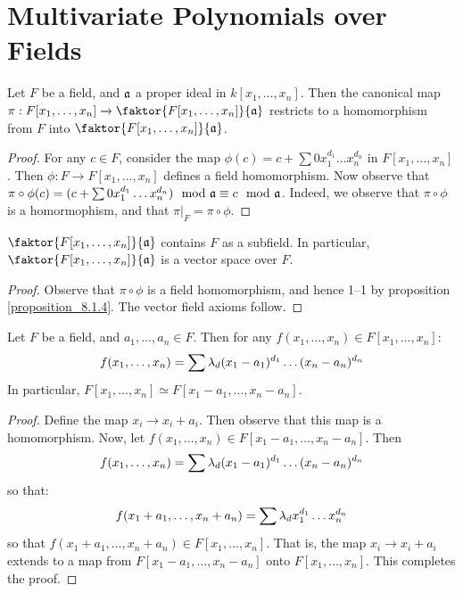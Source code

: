 \section{Multivariate Polynomials over Fields}

\begin{theorem}\label{theorem_8.8.1}
  Let $F$ be a field, and $\mathfrak{a}$ a proper ideal in $k[x_1, \dots,
  x_n]$. Then the canonical map $\pi:F[x_1, \dots, x_n] \xrightarrow{}
  \faktor{F[x_1, \dots, x_n]}{\af}$ restricts to a homomorphism from
  $F$ into $\faktor{F[x_1, \dots, x_n]}{\af}$.
\end{theorem}
\begin{proof}
  For any $c \in F$, consider the map $\phi(c)=c+\sum{0x_1^{d_1} \dots
  x_n^{d_n}}$ in $F[x_1, \dots, x_n]$. Then $\phi:F \xrightarrow{}
  F[x_1, \dots, x_n]$ defines a field homomorphism. Now observe that
  $\pi \circ \phi(c)=(c+\sum{0x_1^{d_1} \dots x_n^{d_n}}) \mod{\mathfrak{a}}
  \equiv c \mod{\mathfrak{a}}$. Indeed, we observe that $\pi \circ \phi$ is a
  homormophism, and that $\pi|_F=\pi \circ \phi$.
\end{proof}
\begin{corollary}
  $\faktor{F[x_1, \dots, x_n]}{\af}$ contains $F$ as a subfield. In
  particular, $\faktor{F[x_1, \dots, x_n]}{\af}$ is a vector space
  over $F$.
\end{corollary}
\begin{proof}
  Observe that $\pi \circ \phi$ is a field homomorphism, and hence
  1--1 by proposition \ref{proposition_8.1.4}. The vector field
  axioms follow.
\end{proof}

\begin{proposition}\label{proposition_8.8.2}
  Let $F$ be a field, and $a_1, \dots, a_n \in F$. Then for any
  $f(x_1, \dots, x_n) \in F[x_1, \dots, x_n]$:
  \begin{equation*}
    f(x_1, \dots, x_n)=\sum{\lambda_d(x_1-a_1)^{d_1} \dots (x_n-a_n)^{d_n}}
  \end{equation*}
  In particular, $F[x_1, \dots, x_n] \simeq F[x_1-a_1, \dots,
  x_n-a_n]$.
\end{proposition}
\begin{proof}
  Define the map $x_i \xrightarrow{} x_{i}+a_i$. Then observe that
  this map is a homomorphism. Now, let $f(x_1, \dots, x_n) \in
  F[x_1-a_1, \dots, x_n-a_n]$. Then
  \begin{equation*}
    f(x_1, \dots, x_n)=\sum{\lambda_d(x_1-a_1)^{d_1} \dots (x_n-a_n)^{d_n}}
  \end{equation*}
  so that:
  \begin{equation*}
    f(x_1+a_1, \dots, x_n+a_n)=\sum{\lambda_dx_1^{d_1} \dots x_n^{d_n}}
  \end{equation*}
  so that $f(x_1+a_1, \dots, x_n+a_n) \in F[x_1, \dots, x_n]$. That is,
  the map $x_i \xrightarrow{} x_i+a_i$ extends to a map from
  $F[x_1-a_1, \dots, x_n-a_n]$ onto $F[x_1, \dots, x_n]$. This
  completes the proof.
\end{proof}

